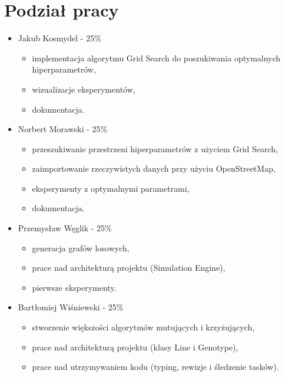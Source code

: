 \documentclass[12pt,a4paper]{article}
\begin{document}
\section{Podział pracy}
\begin{itemize}
    \item Jakub Kosmydel - 25\%
    \begin{itemize}
        \item implementacja algorytmu Grid Search do poszukiwania optymalnych hiperparametrów,
        \item wizualizacje eksperymentów,
        \item dokumentacja.
    \end{itemize}
    \item Norbert Morawski - 25\%
    \begin{itemize}
        \item przeszukiwanie przestrzeni hiperparametrów z użyciem Grid Search,
        \item zaimportowanie rzeczywistych danych przy użyciu OpenStreetMap,
        \item eksperymenty z optymalnymi parametrami,
        \item dokumentacja.
    \end{itemize}
    \item Przemysław Węglik - 25\%
    \begin{itemize}
        \item generacja grafów losowych,
        \item prace nad architekturą projektu (Simulation Engine),
        \item pierwsze eksperymenty.
    \end{itemize}
    \item Bartłomiej Wiśniewski - 25\%
    \begin{itemize}
        \item stworzenie większości algorytmów mutujących i krzyżujących,
        \item prace nad architekturą projektu (klasy Line i Genotype),
        \item prace nad utrzymywaniem kodu (typing, rewizje i śledzenie tasków).
    \end{itemize}
\end{itemize}
\end{document}
